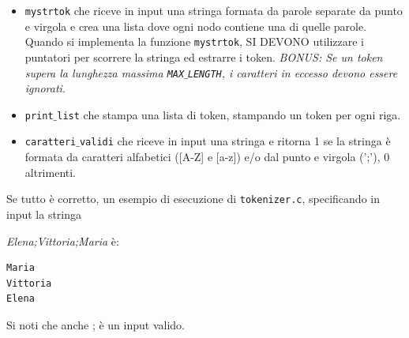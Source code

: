 \documentclass[12pt]{article}
\begin{document}
\begin{itemize}
\item \texttt{mystrtok} che riceve in input una stringa formata da parole separate da punto e virgola e crea una lista dove ogni nodo contiene una di quelle parole. Quando si implementa la funzione \texttt{mystrtok}, SI DEVONO utilizzare i puntatori per scorrere la stringa ed estrarre i token. \textit{BONUS: Se un token supera la lunghezza massima \texttt{MAX$\_$LENGTH}, i caratteri in eccesso devono essere ignorati.}
\item \texttt{print$\_$list} che stampa una lista di token, stampando un token per ogni riga. 
\item \texttt{caratteri$\_$validi} che riceve in input una stringa e ritorna 1 se la stringa è formata da caratteri alfabetici ([A-Z] e [a-z]) e/o dal punto e virgola (';'), 0 altrimenti.
\end{itemize}

Se tutto \`e corretto, un esempio di esecuzione di \texttt{tokenizer.c}, specificando in input la stringa

\textit{Elena;Vittoria;Maria} \`e:
\begin{mdframed}[backgroundcolor=verylightgray] 
\begin{verbatim}
Maria
Vittoria
Elena
\end{verbatim}
\end{mdframed}
Si noti che anche ; è un input valido.
\end{document}
